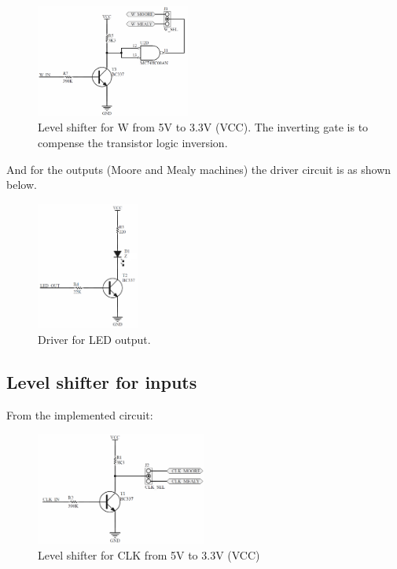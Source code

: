\begin{figure}[H]
    \begin{centering}
    \includegraphics[width=0.45\textwidth]{Graficos3/W_Driver.png}
    \par\end{centering}
    \caption{Level shifter for W from 5V to 3.3V (VCC). The inverting gate is to compense the transistor logic inversion.}
\end{figure}

And for the outputs (Moore and Mealy machines) 
the driver circuit is as shown below.

\begin{figure}[H]
    \begin{centering}
    \includegraphics[width=0.3\textwidth]{Graficos3/LED_Driver.png}
    \par\end{centering}
    \caption{Driver for LED output.}
\end{figure}


\newpage

\subsection*{Level shifter for inputs}
From the implemented circuit:
\begin{figure}[H]
    \begin{centering}
    \includegraphics[width=0.5\textwidth]{Graficos3/CLK_Driver.png}
    \par\end{centering}
    \caption{Level shifter for CLK from 5V to 3.3V (VCC)}
\end{figure}

